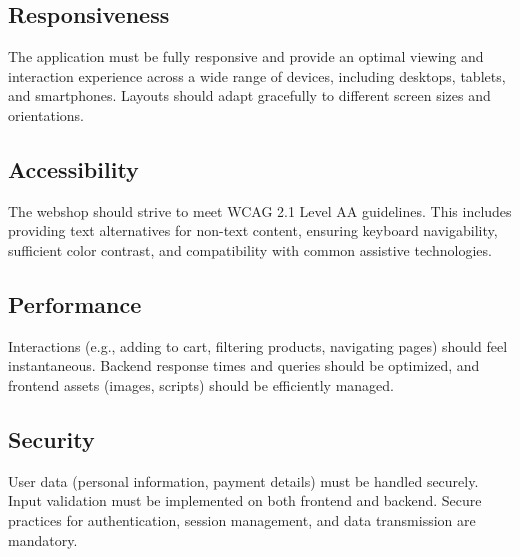 \documentclass[a4paper,11pt]{article}
\begin{document}
\subsection{Responsiveness}
The application must be fully responsive and provide an optimal viewing and interaction experience across a wide range of devices, including desktops, tablets, and smartphones. Layouts should adapt gracefully to different screen sizes and orientations.

\subsection{Accessibility}
The webshop should strive to meet WCAG 2.1 Level AA guidelines. This includes providing text alternatives for non-text content, ensuring keyboard navigability, sufficient color contrast, and compatibility with common assistive technologies.

\subsection{Performance}
Interactions (e.g., adding to cart, filtering products, navigating pages) should feel instantaneous. Backend response times and queries should be optimized, and frontend assets (images, scripts) should be efficiently managed.

\subsection{Security}
User data (personal information, payment details) must be handled securely. Input validation must be implemented on both frontend and backend. Secure practices for authentication, session management, and data transmission are mandatory.


\end{document}
